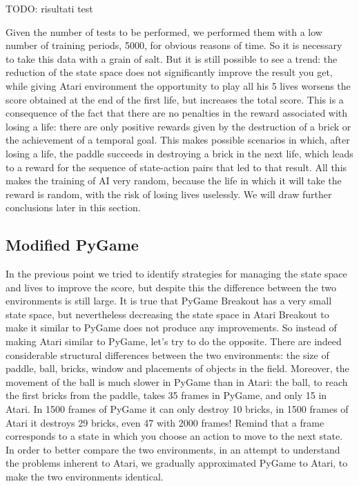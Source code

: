 \smallskip
TODO: risultati test
\smallskip

Given the number of tests to be performed, we performed them with a low number of training periods, 5000, for obvious reasons of time. So it is necessary to take this data with a grain of salt. But it is still possible to see a trend: the reduction of the state space does not significantly improve the result you get, while giving Atari environment the opportunity to play all his 5 lives worsens the score obtained at the end of the first life, but increases the total score. This is a consequence of the fact that there are no penalties in the reward associated with losing a life: there are only positive rewards given by the destruction of a brick or the achievement of a temporal goal. This makes possible scenarios in which, after losing a life, the paddle succeeds in destroying a brick in the next life, which leads to a reward for the sequence of state-action pairs that led to that result. All this makes the training of AI very random, because the life in which it will take the reward is random, with the risk of losing lives uselessly. We will draw further conclusions later in this section.

\subsection{Modified PyGame}

In the previous point we tried to identify strategies for managing the state space and lives to improve the score, but despite this the difference between the two environments is still large. It is true that PyGame Breakout has a very small state space, but nevertheless decreasing the state space in Atari Breakout to make it similar to PyGame does not produce any improvements. So instead of making Atari similar to PyGame, let's try to do the opposite. There are indeed considerable structural differences between the two environments: the size of paddle, ball, bricks, window and placements of objects in the field. Moreover, the movement of the ball is much slower in PyGame than in Atari: the ball, to reach the first bricks from the paddle, takes 35 frames in PyGame, and only 15 in Atari. In 1500 frames of PyGame it can only destroy 10 bricks, in 1500 frames of Atari it destroys 29 bricks, even 47 with 2000 frames! Remind that a frame corresponds to a state in which you choose an action to move to the next state. In order to better compare the two environments, in an attempt to understand the problems inherent to Atari, we gradually approximated PyGame to Atari, to make the two environments identical.

